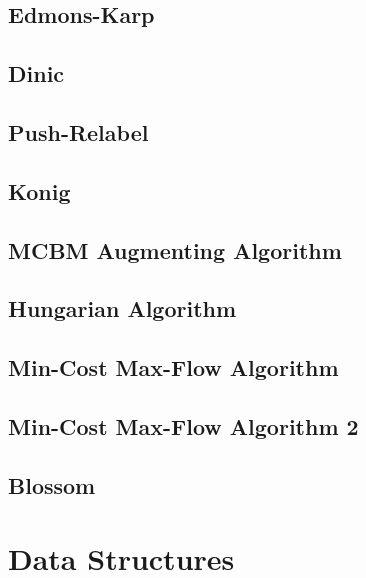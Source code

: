 \subsection{Edmons-Karp}
\raggedbottom
\hrulefill
\subsection{Dinic}
\raggedbottom
\hrulefill
\subsection{Push-Relabel}
\raggedbottom
\hrulefill
\subsection{Konig}
\raggedbottom
\hrulefill
\subsection{MCBM Augmenting Algorithm}
\raggedbottom
\hrulefill
\subsection{Hungarian Algorithm}
\raggedbottom
\hrulefill
\subsection{Min-Cost Max-Flow Algorithm}
\raggedbottom
\hrulefill
\subsection{Min-Cost Max-Flow Algorithm 2}
\raggedbottom
\hrulefill
\subsection{Blossom}
\raggedbottom
\hrulefill

\section{Data Structures}

